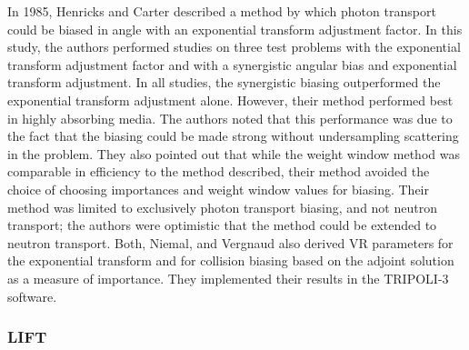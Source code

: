 In 1985, Henricks and Carter \cite{hendricks_anisotropic_1985} described a
method by which
photon transport could be biased in angle with an exponential transform
adjustment factor.
In this study, the authors performed studies on three test problems with the
exponential
transform adjustment factor and with a synergistic angular bias and exponential
transform
adjustment.
In all studies, the synergistic biasing outperformed the exponential transform
adjustment
alone.
However, their method performed best in highly absorbing media.
The authors noted that this performance was due to the fact that the biasing
could be made
strong without undersampling scattering in the problem.
They also pointed out that while the weight window method was comparable in
efficiency to the
method described, their method avoided the choice of choosing importances and
weight window
values for biasing. Their method was limited to exclusively photon transport
biasing, and not
neutron transport; the authors were optimistic that the method could be extended
to neutron
transport.
Both, Niemal, and Vergnaud \cite{both_automated_1990} also derived VR parameters for
the exponential transform and for collision biasing based on the adjoint
solution as a measure of importance. They implemented their results in the
TRIPOLI-3 software.

\subsubsection{LIFT}
\label{subsec:LIFT}

